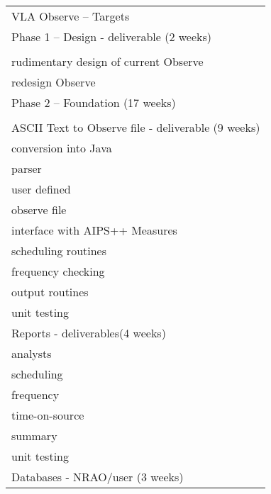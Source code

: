 \begin{longtable}{l}
VLA Observe -- Targets\\
Phase 1 -- Design - deliverable (2 weeks)\\
\hline\\
\hspace{0.25in} rudimentary design of current Observe\\
\hspace{0.25in} redesign Observe\\
Phase 2 -- Foundation (17 weeks)\\
\hline\\
ASCII Text to Observe file - deliverable (9 weeks)\\
   \hspace{0.25in}conversion into Java\\
   \hspace{0.25in}parser\\
   \hspace{0.5in}   user defined\\
   \hspace{0.5in}   observe file\\
   \hspace{0.25in}interface with AIPS++ Measures\\
   \hspace{0.25in}scheduling routines\\
   \hspace{0.25in}frequency checking\\
   \hspace{0.25in}output routines\\
   \hspace{0.25in}unit testing
\\
Reports - deliverables(4 weeks)\\
   \hspace{0.25in}analysts\\
   \hspace{0.25in}scheduling\\
   \hspace{0.25in}frequency\\
   \hspace{0.25in}time-on-source\\
   \hspace{0.25in}summary\\
   \hspace{0.25in}unit testing
\\
Databases - NRAO/user (3 weeks)\\

\end{longtable}
